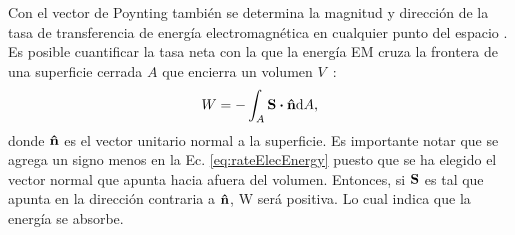 Con el vector de Poynting también se determina la magnitud y dirección de la tasa de transferencia de energía electromagnética en cualquier punto del espacio \cite{Bohren}. Es posible cuantificar la tasa neta con la que la energía EM cruza la frontera de una superficie cerrada $A$ que encierra un volumen $V$~\cite{Bohren}:
\begin{equation}
W=- \int_{A} \vb{S} \vdot \vu{n} \dd A,
\label{eq:rateElecEnergy}
\end{equation}
donde $\vu{n}$ es el vector unitario normal a la superficie. Es importante notar que se agrega un signo menos en la Ec. \eqref{eq:rateElecEnergy} puesto que se ha elegido el vector normal que apunta hacia afuera del volumen. Entonces, si $\vb{S}$ es tal que apunta en la dirección contraria a $\vu{n}$, W será positiva. Lo cual indica que la energía se absorbe. 



